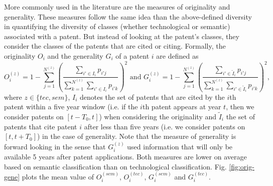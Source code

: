 More commonly used in the literature are the measures of originality and generality. These measures follow the same idea than the above-defined diversity in quantifying the diversity of classes (whether technological or semantic) associated with a patent. But instead of looking at the patent's classes, they consider the classes of the patents that are cited or citing. Formally, the originality $O_i$ and the generality $G_i$ of a patent $i$ are defined as
\[
O_i^{(z)} = \displaystyle 1 - \sum_{j =1}^{N^{(z)}}{\left(\frac{\displaystyle \sum_{i' \in I_i}{p_{i'j}}}{\displaystyle \sum_{k =1}^{N^{(z)}}{\displaystyle \sum_{i' \in I_i}{p_{i'k}}}}\right)^2} \text{ and } G_i^{(z)} = \displaystyle 1 - \sum_{j =1}^{N^{(z)}}{\left(\frac{\displaystyle \sum_{i' \in \tilde{I}_i}{p_{i'j}}}{\displaystyle \sum_{k =1}^{N^{(z)}}{\displaystyle \sum_{i' \in \tilde{I}_i}{p_{i'k}}}}\right)^2}, 
\]
where $z \in \{tec, sem\}$, $I_i$ denotes the set of patents that are cited by the $i$th patent within a five year window (i.e. if the $i$th patent appears at year $t$, then we consider patents on $[t-T_0, t]$) when considering the originality and $\tilde{I}_i$ the set of patents that cite patent $i$ after less than five years (i.e. we consider patents on $[t ,t + T_0]$) in the case of generality. Note that the measure of generality is forward looking in the sense that $G_i^{(z)}$ used information that will only be available 5 years after patent applications. Both measures are lower on average based on semantic classification than on technological classification. Fig. \ref{fig:orig-gene} plots the mean value of $O_i^{(sem)}$, $O_i^{(tec)}$, $G_i^{(sem)}$ and $G_i^{(tec)}$.

